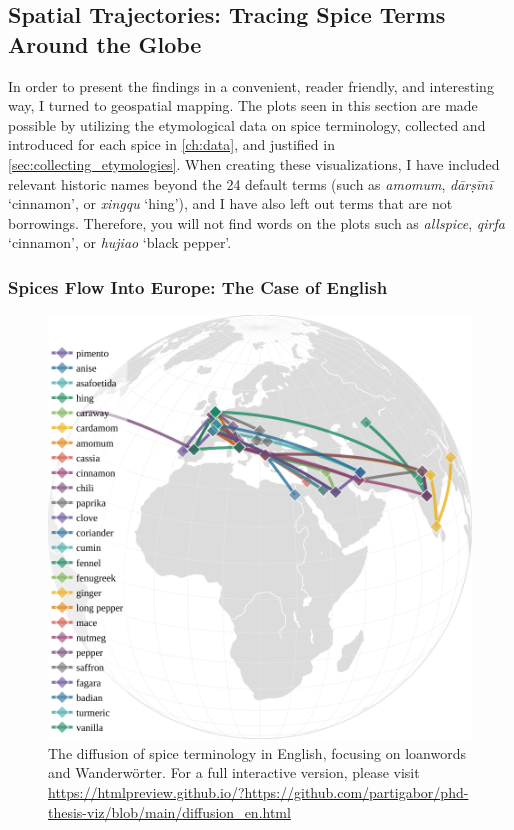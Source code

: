 

\subsection{Spatial Trajectories: Tracing Spice Terms Around the Globe}

In order to present the findings in a convenient, reader friendly, and interesting way, I turned to geospatial mapping. The plots seen in this section are made possible by utilizing the etymological data on spice terminology, collected and introduced for each spice in \cref{ch:data}, and justified in \cref{sec:collecting_etymologies}. When creating these visualizations, I have included relevant historic names beyond the 24 default terms (such as \textit{amomum}, \textit{dārṣīnī} `cinnamon', or \textit{xingqu} `hing'), and I have also left out terms that are not borrowings. Therefore, you will not find words on the plots such as \textit{allspice}, \textit{qirfa} `cinnamon', or \textit{hujiao} `black pepper'.

\subsubsection{Spices Flow Into Europe: The Case of English}

\begin{figure}[ht!]
  \includegraphics[width=\linewidth]{imgs/plots/diffusion_en.pdf}
  \caption{The diffusion of spice terminology in English, focusing on loanwords and Wanderwörter. For a full interactive version, please visit \url{https://htmlpreview.github.io/?https://github.com/partigabor/phd-thesis-viz/blob/main/diffusion_en.html}}
  \label{fig:diffusion_en}
\end{figure}

